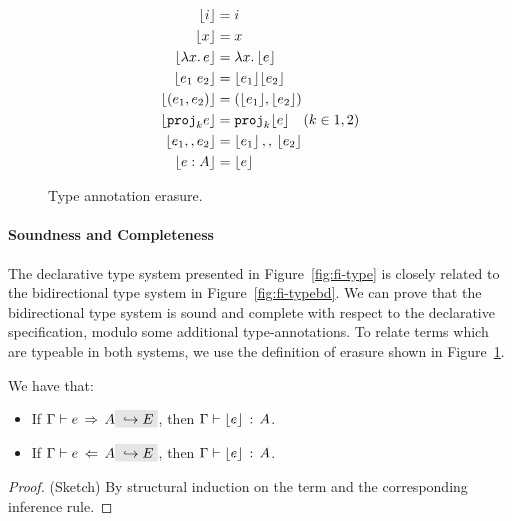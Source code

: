 \begin{figure}[t]
  \begin{align*}
    \lfloor i \rfloor                   &= i \\
    \lfloor x \rfloor                   &= x \\
    \lfloor \lambda x.\, e \rfloor            &= \lambda x.\, \lfloor e \rfloor \\
    \lfloor e_1 \; e_2 \rfloor    &= {\lfloor e_1 \rfloor} {\lfloor e_2 \rfloor} \\
    \lfloor (e_1, e_2) \rfloor   &= (\lfloor e_1 \rfloor, \lfloor e_2 \rfloor) \\
    \lfloor {\texttt{proj}}_{k} e \rfloor           &= {\texttt{proj}}_{k} \lfloor e \rfloor \quad (k \in {1,2}) \\ 
    \lfloor {e_1} ,, {e_2} \rfloor      &= {\lfloor e_1 \rfloor} \, ,, \, {\lfloor e_2 \rfloor} \\
    \lfloor e : A \rfloor               &= {\lfloor e \rfloor} 
  \end{align*}
  \caption{Type annotation erasure.}
  \label{fig:type-ann-erasure}
\end{figure}

\paragraph{Soundness and Completeness} The declarative type system presented in
Figure~\ref{fig:fi-type} is closely related to the bidirectional type system 
in Figure~\ref{fig:fi-typebd}. We can prove that the bidirectional type system 
is sound and complete with respect to the declarative specification, 
modulo some additional type-annotations. To relate terms which are
typeable in both systems, we use the definition of erasure shown in Figure~\ref{fig:type-ann-erasure}.

\begin{theorem}
  We have that:
  \begin{itemize}
    \item If $ \jinfer \Gamma e A \yields E$, then $ \Gamma \vdash \lfloor e \rfloor \ \!:\! \ A$.
    \item If $ \jcheck \Gamma e A \yields E$, then $ \Gamma \vdash \lfloor e \rfloor \ \!:\! \ A$.
  \end{itemize}
\end{theorem}

\begin{proof}
  (Sketch) By structural induction on the term and the corresponding
  inference rule.
\end{proof}

